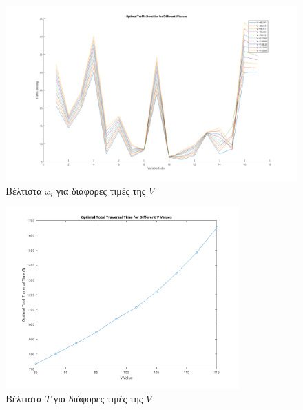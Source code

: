 \documentclass[twocolumn]{report}
\begin{document}
\onecolumn
\begin{figure}[H]
    \centering
    \includegraphics[width=1\textwidth]{media/optimalXplot.png}
    \caption{Βέλτιστα $x_i$ για διάφορες τιμές της $V$}
    \label{fig:optimalXplot}
\end{figure}
\begin{figure}[H]
    \centering
    \includegraphics[width=0.8\textwidth]{media/optimalTplot.png}
    \caption{Βέλτιστα $T$ για διάφορες τιμές της $V$}
    \label{fig:optimalTplot}
\end{figure}


\end{document}
